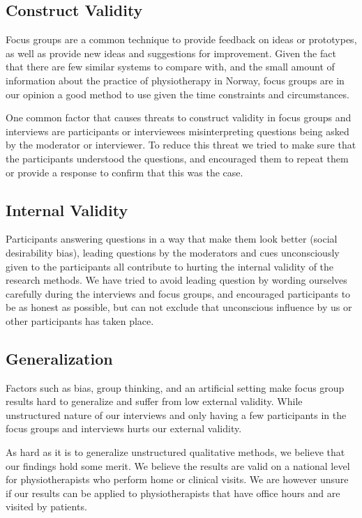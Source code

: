 \subsection{Construct Validity}

Focus groups are a common technique to provide feedback on ideas or prototypes, as well as provide new ideas and suggestions for improvement. Given the fact that there are few similar systems to compare with, and the small amount of information about the practice of physiotherapy in Norway, focus groups are in our opinion a good method to use given the time constraints and circumstances.

One common factor that causes threats to construct validity in focus groups and interviews are participants or interviewees misinterpreting questions being asked by the moderator or interviewer. To reduce this threat we tried to make sure that the participants understood the questions, and encouraged them to repeat them or provide a response to confirm that this was the case.

\subsection{Internal Validity}
Participants answering questions in a way that make them look better (social desirability bias), leading questions by the moderators and cues unconsciously given to the participants all contribute to hurting the internal validity of the research methods. We have tried to avoid leading question by wording ourselves carefully during the interviews and focus groups, and encouraged participants to be as honest as possible, but can not exclude that unconscious influence by us or other participants has taken place.

\subsection{Generalization}
Factors such as bias, group thinking, and an artificial setting make focus group results hard to generalize and suffer from low external validity. While unstructured nature of our interviews and only having a few participants in the focus groups and interviews hurts our external validity.

As hard as it is to generalize unstructured qualitative methods, we believe that our findings hold some merit. We believe the results are valid on a national level for physiotherapists who perform home or clinical visits. We are however unsure if our results can be applied to physiotherapists that have office hours and are visited by patients.

